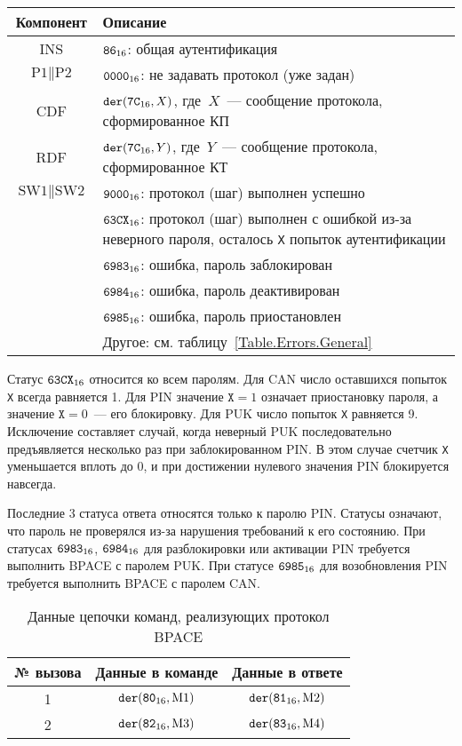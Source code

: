\begin{table}[H]
\caption{}\label{Table.Oper.GABPACECmd}
\begin{tabular}{|c|p{14cm}|}
\hline
Компонент & 	Описание \\
\hline
\hline
INS & $\texttt{86}_{16}$: общая аутентификация \\
\hline
$\text{P1} \parallel \text{P2}$ & $\texttt{0000}_{16}$: не задавать протокол (уже задан)\\ 
\hline
CDF & $\texttt{der}(\texttt{7C}_{16}, X)$, 
где~$X$~--- сообщение протокола, сформированное КП\\ 
\hline 
\hline
RDF & $\texttt{der}(\texttt{7C}_{16}, Y)$, где~$Y$~--- 
сообщение протокола, сформированное КТ\\
\hline
$\text{SW1} \parallel \text{SW2}$ & 
$\texttt{9000}_{16}$: протокол (шаг) выполнен успешно\\
\cline{2-2}
& $\texttt{63CX}_{16}$: протокол (шаг) выполнен с ошибкой из-за 
неверного пароля, осталось \texttt{X} попыток аутентификации\\
\cline{2-2}
& $\texttt{6983}_{16}$: ошибка, пароль заблокирован\\
\cline{2-2}
& $\texttt{6984}_{16}$: ошибка, пароль деактивирован\\
\cline{2-2}
& $\texttt{6985}_{16}$: ошибка, пароль приостановлен\\
\cline{2-2}
& Другое: см. таблицу~\ref{Table.Errors.General} \\
\hline
\end{tabular}
\end{table}

Статус $\texttt{63CX}_{16}$ относится ко всем паролям.
%
Для CAN число оставшихся попыток \texttt{X} всегда равняется 1.
%
Для PIN значение $\texttt{X}=1$ означает приостановку пароля,
а значение $\texttt{X}=0$~--- его блокировку.
%
Для PUK число попыток \texttt{X} равняется 9.
Исключение составляет случай, когда неверный PUK 
последовательно предъявляется несколько раз при заблокированном PIN.
В этом случае счетчик \texttt{X} уменьшается вплоть до 0,
и при достижении нулевого значения PIN блокируется навсегда.

Последние 3 статуса ответа относятся только к паролю PIN.
Статусы означают, что пароль не проверялся из-за нарушения 
требований к его состоянию. При статусах $\texttt{6983}_{16}$, $\texttt{6984}_{16}$ для 
разблокировки или активации PIN требуется выполнить BPACE с паролем PUK. При 
статусе $\texttt{6985}_{16}$ для возобновления PIN требуется выполнить BPACE с паролем CAN. 

\begin{table}[H]
\caption{Данные цепочки команд, реализующих протокол BPACE}
\label{Table.Oper.BPACE}
\begin{tabular}{|c|c|c|}
\hline
№ вызова & Данные в команде & Данные в ответе\\
\hline
\hline
1 & $\texttt{der}(\texttt{80}_{16}, \text{M1})$ & 
$\texttt{der}(\texttt{81}_{16}, \text{M2})$\\
\hline
2 & $\texttt{der}(\texttt{82}_{16}, \text{M3})$ & 
$\texttt{der}(\texttt{83}_{16}, \text{M4})$\\
\hline
\end{tabular}
\end{table}

